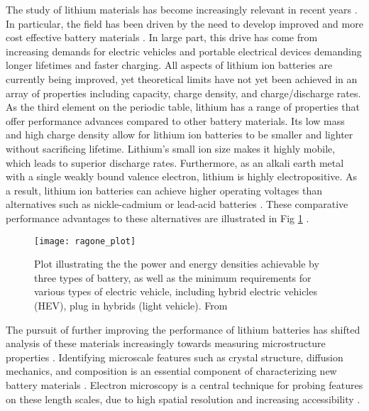 



 

The study of lithium materials has become increasingly relevant in recent years \cite{nitta_li-ion_2015}.  In particular, the field has been driven by the need to develop improved  and more cost effective battery materials \cite{nitta_li-ion_2015}.  In large part, this drive has come from increasing demands for electric vehicles and portable electrical devices demanding longer lifetimes and faster charging.  All aspects of lithium ion batteries are currently being improved, yet theoretical limits have not yet been achieved in an array of properties including capacity, charge density, and charge/discharge rates. \\


As the third element on the periodic table, lithium has a range of properties that offer performance advances compared to other battery materials.  Its low mass and high charge density allow for lithium ion batteries to be smaller and lighter without sacrificing lifetime.  Lithium's small ion size makes it highly mobile, which leads to superior discharge rates.   Furthermore, as an alkali earth metal with a single weakly bound valence electron, lithium is highly electropositive.   As a result, lithium ion batteries can achieve higher operating voltages than alternatives such as nickle-cadmium or lead-acid batteries \cite{etacheri_challenges_2011}.  These comparative performance advantages to these alternatives are illustrated in Fig \ref{ragone} \cite{etacheri_challenges_2011}.\\

\begin{figure}
	\centering
	\texttt{[image: ragone\_plot]}
	\caption{Plot illustrating the the power and energy densities achievable by three types of battery, as well as the minimum requirements for various types of electric vehicle, including hybrid electric vehicles (HEV), plug in hybrids (light vehicle). From \cite{etacheri_challenges_2011} }
	\label{ragone}
	
\end{figure}
The pursuit of further improving the performance of lithium batteries has shifted analysis of these materials increasingly towards measuring microstructure properties \cite{lu_lithium_2012,arthur_spontaneous_2016, muller_quantification_2018}. Identifying microscale features such as crystal structure, diffusion mechanics, and composition is an essential component of characterizing new battery materials \cite{van_der_ven_first-principles_2001}.  Electron microscopy is a central technique for probing features on these length scales, due to high spatial resolution and increasing accessibility   \cite{chiu_aqueous_2013,inkson_2_2016, hansen_atomic-resolution_2001}. \\

